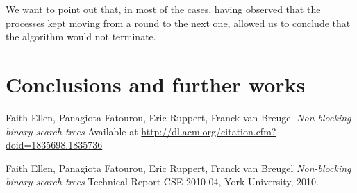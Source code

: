 \documentclass[a4paper]{article}
\begin{document}
We want to point out that, in most of the cases, having observed that the processes kept moving from a round to the next one, allowed us to conclude that the algorithm would not terminate.


\section{Conclusions and further works}
\label{sec:conclusions}





\begin{thebibliography}{5}

 Faith Ellen, Panagiota Fatourou, Eric Ruppert, Franck van Breugel
\textit{Non-blocking binary search trees} Available at
\url{http://dl.acm.org/citation.cfm?doid=1835698.1835736}

 Faith Ellen, Panagiota Fatourou, Eric Ruppert, Franck van Breugel
\textit{Non-blocking binary search trees} Technical Report CSE-2010-04, York University, 2010.

\end{thebibliography}
\end{document}
